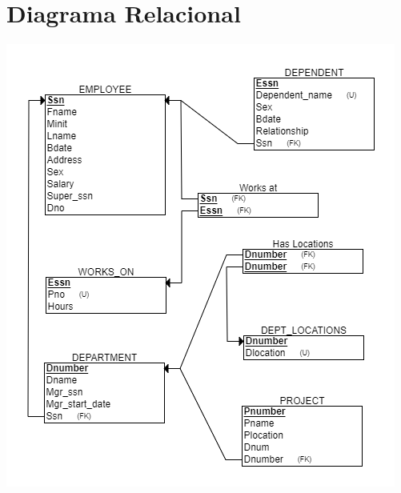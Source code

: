 \documentclass[a4paper,12pt]{article}
\begin{document}
\section*{Diagrama Relacional}
\begin{center}
    \includegraphics[scale = 1]{IMA/imageSC.png}
\end{center}




\end{document}
